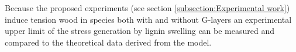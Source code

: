 Because the proposed experiments (see section \ref{subsection:Experimental work}) induce tension wood in species
both with and without G-layers an experimental upper limit of the stress
generation by lignin swelling can be measured and
compared to the theoretical data derived from the model.